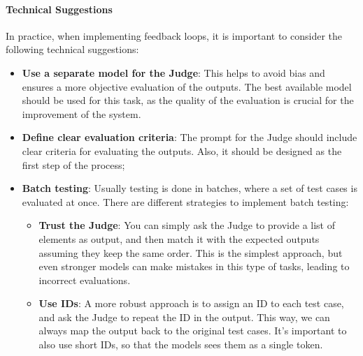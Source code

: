 \paragraph{Technical Suggestions}
In practice, when implementing feedback loops, it is important to consider the following technical suggestions:
\begin{itemize}
    \item \textbf{Use a separate model for the Judge}: This helps to avoid bias and ensures a more objective evaluation of the outputs.
    The best available model should be used for this task, as the quality of the evaluation is crucial for the improvement of the system.
    \item \textbf{Define clear evaluation criteria}: The prompt for the Judge should include clear criteria for evaluating the outputs. 
    Also, it should be designed as the first step of the process;
    \item \textbf{Batch testing}: Usually testing is done in batches, where a set of test cases is evaluated at once.
    There are different strategies to implement batch testing:
    \begin{itemize}
        \item \textbf{Trust the Judge}: You can simply ask the Judge to provide a list of elements as output, 
        and then match it with the expected outputs assuming they keep the same order. 
        This is the simplest approach, but even stronger models can make mistakes in this type of tasks, leading to incorrect evaluations.
        \item \textbf{Use IDs}: A more robust approach is to assign an ID to each test case, and ask the Judge to repeat the ID in the output. 
        This way, we can always map the output back to the original test cases. It's important to also use short IDs, so that the models
        sees them as a single token.
    \end{itemize}
\end{itemize}